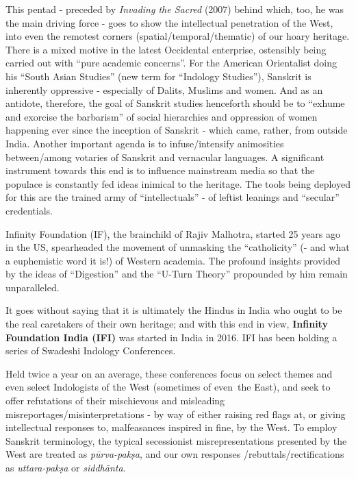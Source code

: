 This pentad - preceded by {\sl Invading the Sacred} (2007) behind which, too, he was the main driving force - goes to show the intellectual penetration of the West, into even the remotest corners (spatial/temporal/\break thematic) of our hoary heritage. There is a mixed motive in the latest Occidental enterprise,  ostensibly being carried out with “pure academic concerns”. For the American Orientalist doing his ``South Asian Studies'' (new term for “Indology Studies”), Sanskrit is inherently oppressive - especially of Dalits, Muslims and women. And as an antidote, therefore, the goal of Sanskrit studies henceforth should be to ``exhume and exorcise the barbarism'' of social hierarchies and oppression of women happening ever since the inception of Sanskrit - which came, rather,  from outside India. Another important agenda is to infuse/intensify animosities between/among votaries of Sanskrit and vernacular languages. A significant instrument towards this end is to influence mainstream media so that the populace is constantly fed ideas inimical to the heritage. The tools being deployed for this are the trained army of “intellectuals” - of leftist leanings and “secular” credentials.
\vskip 1.5pt

Infinity Foundation (IF), the brainchild of Rajiv Malhotra, started 25 years ago in the US, spearheaded the movement of unmasking the “catholicity” (- and what a euphemistic word it is!) of Western academia. The profound insights provided by the ideas of ``Digestion'' and the “U-Turn Theory” propounded by him remain unparalleled.
\vskip 1.5pt

It goes without saying that it is ultimately the Hindus in India who ought to be the real caretakers of their own heritage; and with this end in view, {\bf Infinity Foundation India (IFI)} was started in India in 2016. IFI has been holding a series of Swadeshi Indology Conferences. 
\vskip 1.5pt

Held twice a year on an average, these conferences focus on select themes and even select Indologists of the West (sometimes of even~the East), and seek to offer refutations of their mischievous  and misleading misreportages/misinterpretations - by way of either raising red flags at, or giving intellectual responses to, malfeasances inspired in fine, by the West. To employ Sanskrit terminology, the typical secessionist misrepresentations presented by the West are treated as {\sl pūrva-pakṣa}, and our own responses /rebuttals/rectifications as {\sl uttara-pakṣa} or {\sl siddhānta}. 

